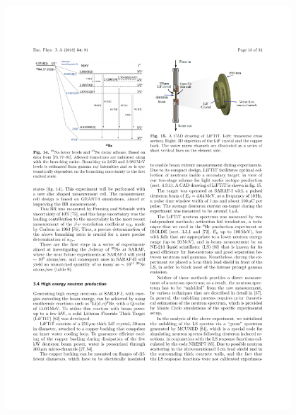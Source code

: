 {\begin{allparts}
\includegraphics[width=0.8\textwidth]{Images/23Na_spectrum_from_paper.pdf}

\endanswer

\end{allparts}
}